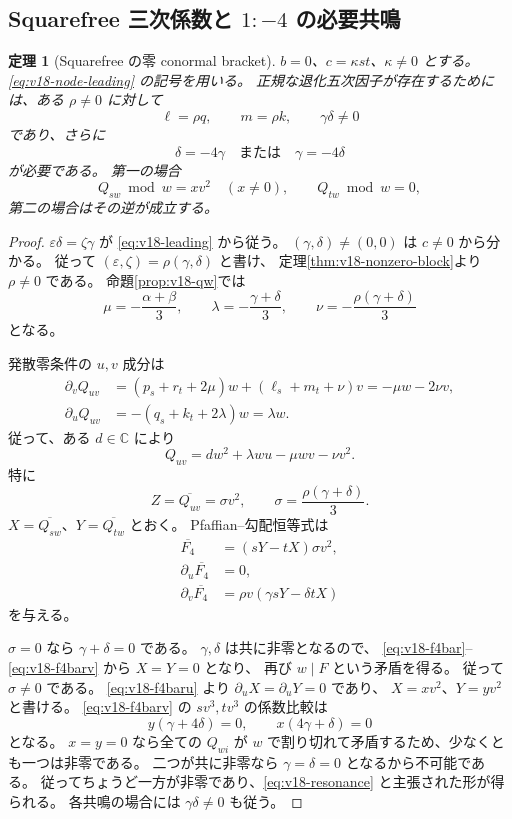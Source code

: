 \documentclass[11pt,a4paper]{ltjsarticle}
\newtheorem{theorem}{定理}[section]
\theoremstyle{remark}\newtheorem{remark}[theorem]{注意}
\begin{document}
\subsection{Squarefree 三次係数と \texorpdfstring{$1:-4$}{1:-4} の必要共鳴}

\begin{theorem}[Squarefree の零 conormal bracket]\label{thm:v18-resonance}
$b=0$、$c=\kappa st$、$\kappa\ne0$ とする。
\eqref{eq:v18-node-leading} の記号を用いる。
正規な退化五次因子が存在するためには、ある $\rho\ne0$ に対して
\[
        \ell=\rho q,\qquad m=\rho k,
        \qquad \gamma\delta\ne0
\]
であり、さらに
\begin{equation}\label{eq:v18-resonance}
                  \delta=-4\gamma\quad\text{または}\quad
                  \gamma=-4\delta
\end{equation}
が必要である。
第一の場合
\[
 Q_{sw}\bmod w=xv^2\quad(x\ne0),\qquad Q_{tw}\bmod w=0,
\]
第二の場合はその逆が成立する。
\end{theorem}

\begin{proof}
$\varepsilon\delta=\zeta\gamma$ が \eqref{eq:v18-leading} から従う。
$(\gamma,\delta)\ne(0,0)$ は $c\ne0$ から分かる。
従って $(\varepsilon,\zeta)=\rho(\gamma,\delta)$ と書け、
定理\ref{thm:v18-nonzero-block}より $\rho\ne0$ である。
命題\ref{prop:v18-qw}では
\[
 \mu=-\frac{\alpha+\beta}{3},\qquad
 \lambda=-\frac{\gamma+\delta}{3},\qquad
 \nu=-\frac{\rho(\gamma+\delta)}{3}
\]
となる。

発散零条件の $u,v$ 成分は
\begin{align*}
 \partial_vQ_{uv}
   &=(p_s+r_t+2\mu)w+(\ell_s+m_t+\nu)v
     =-\mu w-2\nu v,\\
 \partial_uQ_{uv}
   &=-(q_s+k_t+2\lambda)w=\lambda w.
\end{align*}
従って、ある $d\in\mathbb C$ により
\[
                  Q_{uv}=dw^2+\lambda wu-\mu wv-\nu v^2.
\]
特に
\[
 Z=\overline{Q_{uv}}=\sigma v^2,
 \qquad \sigma=\frac{\rho(\gamma+\delta)}3.
\]
$X=\overline{Q_{sw}}$、$Y=\overline{Q_{tw}}$ とおく。
Pfaffian--勾配恒等式は
\begin{align}
 \overline{F_4}&=(sY-tX)\sigma v^2,\label{eq:v18-f4bar}\\
 \partial_u\overline{F_4}&=0,\label{eq:v18-f4baru}\\
 \partial_v\overline{F_4}&=\rho v(\gamma sY-\delta tX)
 \label{eq:v18-f4barv}
\end{align}
を与える。

$\sigma=0$ なら $\gamma+\delta=0$ である。
$\gamma,\delta$ は共に非零となるので、
\eqref{eq:v18-f4bar}--\eqref{eq:v18-f4barv} から $X=Y=0$ となり、
再び $w\mid F$ という矛盾を得る。
従って $\sigma\ne0$ である。
\eqref{eq:v18-f4baru} より $\partial_uX=\partial_uY=0$ であり、
$X=xv^2$、$Y=yv^2$ と書ける。
\eqref{eq:v18-f4barv} の $sv^3,tv^3$ の係数比較は
\[
                    y(\gamma+4\delta)=0,\qquad
                    x(4\gamma+\delta)=0
\]
となる。
$x=y=0$ なら全ての $Q_{wi}$ が $w$ で割り切れて矛盾するため、少なくとも一つは非零である。
二つが共に非零なら $\gamma=\delta=0$ となるから不可能である。
従ってちょうど一方が非零であり、\eqref{eq:v18-resonance} と主張された形が得られる。
各共鳴の場合には $\gamma\delta\ne0$ も従う。
\end{proof}
\end{document}

